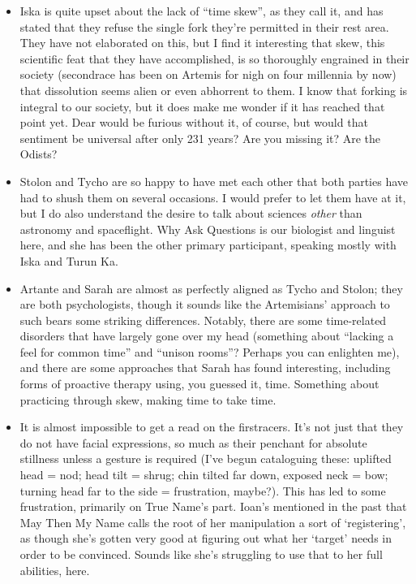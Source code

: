 \begin{itemize}
\tightlist
\item
  Iska is quite upset about the lack of ``time skew'', as they call it, and has stated that they refuse the single fork they're permitted in their rest area. They have not elaborated on this, but I find it interesting that skew, this scientific feat that they have accomplished, is so thoroughly engrained in their society (secondrace has been on Artemis for nigh on four millennia by now) that dissolution seems alien or even abhorrent to them. I know that forking is integral to our society, but it does make me wonder if it has reached that point yet. Dear would be furious without it, of course, but would that sentiment be universal after only 231 years? Are you missing it? Are the Odists?
\item
  Stolon and Tycho are so happy to have met each other that both parties have had to shush them on several occasions. I would prefer to let them have at it, but I do also understand the desire to talk about sciences \emph{other} than astronomy and spaceflight. Why Ask Questions is our biologist and linguist here, and she has been the other primary participant, speaking mostly with Iska and Turun Ka.
\item
  Artante and Sarah are almost as perfectly aligned as Tycho and Stolon; they are both psychologists, though it sounds like the Artemisians' approach to such bears some striking differences. Notably, there are some time-related disorders that have largely gone over my head (something about ``lacking a feel for common time'' and ``unison rooms''? Perhaps you can enlighten me), and there are some approaches that Sarah has found interesting, including forms of proactive therapy using, you guessed it, time. Something about practicing through skew, making time to take time.
\item
  It is almost impossible to get a read on the firstracers. It's not just that they do not have facial expressions, so much as their penchant for absolute stillness unless a gesture is required (I've begun cataloguing these: uplifted head = nod; head tilt = shrug; chin tilted far down, exposed neck = bow; turning head far to the side = frustration, maybe?). This has led to some frustration, primarily on True Name's part. Ioan's mentioned in the past that May Then My Name calls the root of her manipulation a sort of `registering', as though she's gotten very good at figuring out what her `target' needs in order to be convinced. Sounds like she's struggling to use that to her full abilities, here.

\end{itemize}
